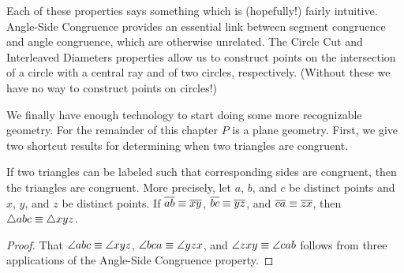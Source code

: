 \begin{dfn}
\begin{proplist}
\begin{center}
\end{center}
\end{proplist}
\end{dfn}

Each of these properties says something which is (hopefully!) fairly intuitive.
Angle-Side Congruence provides an essential link between segment congruence and angle congruence, which are otherwise unrelated.
The Circle Cut and Interleaved Diameters properties allow us to construct points on the intersection of a circle with a central ray and of two circles, respectively.
(Without these we have no way to construct points on circles!)

We finally have enough technology to start doing some more recognizable geometry.
For the remainder of this chapter \(P\) is a plane geometry.
First, we give two shortcut results for determining when two triangles are congruent.

\begin{prop}
If two triangles can be labeled such that corresponding sides are congruent, then the triangles are congruent.
More precisely, let \(a\), \(b\), and \(c\) be distinct points and \(x\), \(y\), and \(z\) be distinct points.
If \(\overline{ab} \equiv \overline{xy}\), \(\overline{bc} \equiv \overline{yz}\), and \(\overline{ca} \equiv \overline{zx}\), then \(\bigtriangleup{abc} \equiv \bigtriangleup{xyz}\).
\end{prop}

\begin{proof}
That \(\angle{abc} \equiv \angle{xyz}\), \(\angle{bca} \equiv \angle{yzx}\), and \(\angle{zxy} \equiv \angle{cab}\) follows from three applications of the Angle-Side Congruence property.
\end{proof}

